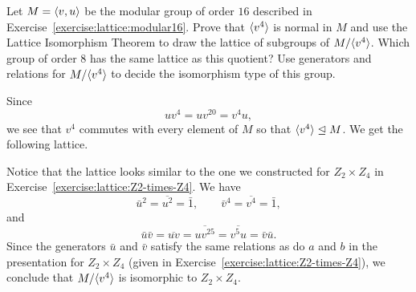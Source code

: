  Let $M = \langle{v,u}\rangle$ be the modular group of order $16$
described in Exercise~\ref{exercise:lattice:modular16}. Prove that
$\langle{v^4}\rangle$ is normal in $M$ and use the Lattice Isomorphism Theorem
to draw the lattice of subgroups of $M/\langle{v^4}\rangle$. Which group of
order $8$ has the same lattice as this quotient? Use generators and
relations for $M/\langle{v^4}\rangle$ to decide the isomorphism type of this
group.
\begin{solution}
  Since
  \begin{equation*}
    uv^4
    = uv^{20}
    = v^4u,
  \end{equation*}
  we see that $v^4$ commutes with every element of $M$ so that
  $\langle{v^4}\rangle\trianglelefteq M$. We get the following lattice.
  \begin{center}
  \end{center}

  Notice that the lattice looks similar to the one we constructed for
  $Z_2\times Z_4$ in Exercise~\ref{exercise:lattice:Z2-times-Z4}. We
  have
  \begin{equation*}
    \bar{u}^2 = \overline{u^2} = \bar1,
    \qquad
    \bar{v}^4 = \overline{v^4} = \bar1,
  \end{equation*}
  and
  \begin{equation*}
    \bar{u}\bar{v}
    = \overline{uv}
    = \overline{uv^{25}}
    = \overline{v^5u}
    = \bar{v}\bar{u}.
  \end{equation*}
  Since the generators $\bar{u}$ and $\bar{v}$ satisfy the same
  relations as do $a$ and $b$ in the presentation for $Z_2\times Z_4$
  (given in Exercise~\ref{exercise:lattice:Z2-times-Z4}), we conclude
  that $M/\langle{v^4}\rangle$ is isomorphic to $Z_2\times Z_4$.
\end{solution}

